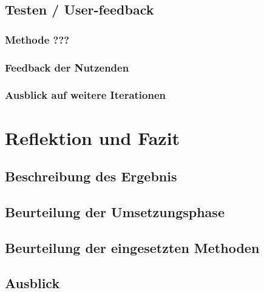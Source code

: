 \documentclass[12pt]{article}
\begin{document}
\subsection{Testen / User-feedback}
\subsubsection{Methode ???}
\subsubsection{Feedback der Nutzenden}
\subsubsection{Ausblick auf weitere Iterationen}

\section{Reflektion und Fazit}
\subsection{Beschreibung des Ergebnis}
\subsection{Beurteilung der Umsetzungsphase}
\subsection{Beurteilung der eingesetzten Methoden}
\subsection{Ausblick}

\newpage



\end{document}
